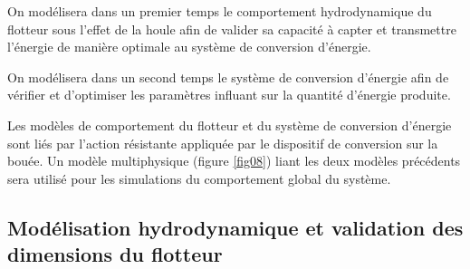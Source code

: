 On modélisera dans un premier temps le comportement hydrodynamique du flotteur sous l'effet de la houle afin de valider sa capacité à capter et transmettre l'énergie de manière optimale au système de conversion d'énergie.

On modélisera dans un second temps le système de conversion d'énergie afin de vérifier et d'optimiser les paramètres influant sur la quantité d'énergie produite.

Les modèles de comportement du flotteur et du système de conversion d'énergie sont liés par l'action résistante appliquée par le dispositif de conversion sur la bouée. Un modèle multiphysique (figure \ref{fig08}) liant les deux modèles précédents sera utilisé pour les simulations du comportement global du système.

\subsection{Modélisation hydrodynamique et validation des dimensions du flotteur}

